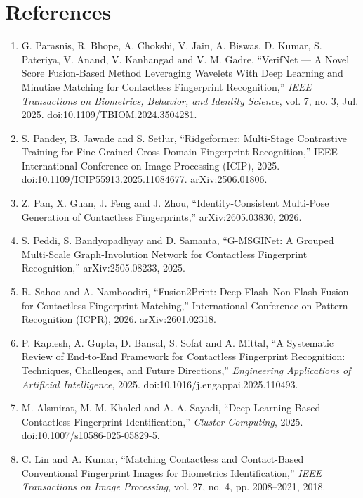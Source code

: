 \documentclass[12pt,a4paper]{article}
\begin{document}
\section*{References}
\begin{enumerate}[leftmargin=*]
    \item G. Parasnis, R. Bhope, A. Chokshi, V. Jain, A. Biswas, D. Kumar, S. Pateriya, V. Anand, V. Kanhangad and V. M. Gadre, ``VerifNet --- A Novel Score Fusion-Based Method Leveraging Wavelets With Deep Learning and Minutiae Matching for Contactless Fingerprint Recognition,'' \emph{IEEE Transactions on Biometrics, Behavior, and Identity Science}, vol. 7, no. 3, Jul. 2025. doi:10.1109/TBIOM.2024.3504281.

    \item S. Pandey, B. Jawade and S. Setlur, ``Ridgeformer: Multi-Stage Contrastive Training for Fine-Grained Cross-Domain Fingerprint Recognition,'' IEEE International Conference on Image Processing (ICIP), 2025. doi:10.1109/ICIP55913.2025.11084677. arXiv:2506.01806.

    \item Z. Pan, X. Guan, J. Feng and J. Zhou, ``Identity-Consistent Multi-Pose Generation of Contactless Fingerprints,'' arXiv:2605.03830, 2026.

    \item S. Peddi, S. Bandyopadhyay and D. Samanta, ``G-MSGINet: A Grouped Multi-Scale Graph-Involution Network for Contactless Fingerprint Recognition,'' arXiv:2505.08233, 2025.

    \item R. Sahoo and A. Namboodiri, ``Fusion2Print: Deep Flash--Non-Flash Fusion for Contactless Fingerprint Matching,'' International Conference on Pattern Recognition (ICPR), 2026. arXiv:2601.02318.

    \item P. Kaplesh, A. Gupta, D. Bansal, S. Sofat and A. Mittal, ``A Systematic Review of End-to-End Framework for Contactless Fingerprint Recognition: Techniques, Challenges, and Future Directions,'' \emph{Engineering Applications of Artificial Intelligence}, 2025. doi:10.1016/j.engappai.2025.110493.

    \item M. Alsmirat, M. M. Khaled and A. A. Sayadi, ``Deep Learning Based Contactless Fingerprint Identification,'' \emph{Cluster Computing}, 2025. doi:10.1007/s10586-025-05829-5.

    \item C. Lin and A. Kumar, ``Matching Contactless and Contact-Based Conventional Fingerprint Images for Biometrics Identification,'' \emph{IEEE Transactions on Image Processing}, vol. 27, no. 4, pp. 2008--2021, 2018.


\end{enumerate}
\end{document}
